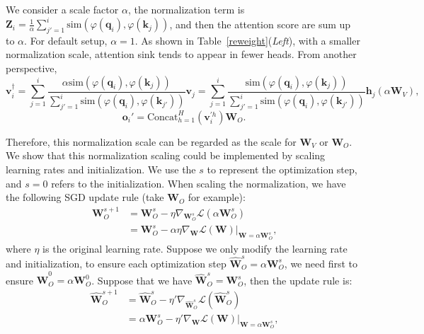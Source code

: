 \documentclass{article} \usepackage{iclr2025_conference,times}
\begin{document}
We consider a scale factor $\alpha$, the normalization term is $\boldsymbol{Z}_i=\frac{1}{\alpha}\sum_{j'=1}^i\textrm{sim}(\varphi(\boldsymbol{q}_i)\textrm{,}\,\varphi(\boldsymbol{k}_j))$, and then the attention score are sum up to $\alpha$. For default setup, $\alpha=\textrm{1}$. As shown in Table~\ref{reweight}(\emph{Left}), with a smaller normalization scale, attention sink tends to appear in fewer heads. From another perspective,
\begin{equation}
\boldsymbol{v}_i^{\dagger}=\sum_{j=1}^i\frac{\alpha
\textrm{sim}(\varphi(\boldsymbol{q}_i)\textrm{,}\,\varphi(\boldsymbol{k}_j))}{\sum_{j'=1}^i\textrm{sim}(\varphi(\boldsymbol{q}_i)\textrm{,}\,\varphi(\boldsymbol{k}_{j'}))}\boldsymbol{v}_j=\sum_{j=1}^i\frac{
\textrm{sim}(\varphi(\boldsymbol{q}_i)\textrm{,}\,\varphi(\boldsymbol{k}_j))}{\sum_{j'=1}^i\textrm{sim}(\varphi(\boldsymbol{q}_i)\textrm{,}\,\varphi(\boldsymbol{k}_{j'}))}\boldsymbol{h}_j(\alpha\boldsymbol{W}_V)\textrm{,}
\end{equation}
\begin{equation}
    \boldsymbol{o}_i'=\textrm{Concat}_{h=1}^H (\boldsymbol{v}_i^{'h})\boldsymbol{W}_O\textrm{.}
\end{equation}

Therefore, this normalization scale can be regarded as the scale for $\boldsymbol{W}_V$ or $\boldsymbol{W}_O$. We show that this normalization scaling could be implemented by scaling learning rates and initialization. We use the $s$ to represent the optimization step, and $s=\textrm{0}$ refers to the initialization. When scaling the normalization, we have the following SGD update rule (take $\boldsymbol{W}_O$ for example):
\begin{align}
    \boldsymbol{W}_O^{s+1}&=\boldsymbol{W}_O^{s}-\eta\nabla_{\boldsymbol{W}_O^{s}} \mathcal{L}(\alpha\boldsymbol{W}_O^{s})\\
    &=\boldsymbol{W}_O^{s}-\alpha\eta\nabla_{\boldsymbol{W}} \mathcal{L}(\boldsymbol{W})|_{\boldsymbol{W}=\alpha\boldsymbol{W}_O^{s}}\textrm{,}
\end{align}
where $\eta$ is the original learning rate. Suppose we only modify the learning rate and initialization, to ensure each optimization step $\hat{\boldsymbol{W}}_O^{s}=\alpha\boldsymbol{W}_O^{s}$, we need first to ensure $\hat{\boldsymbol{W}}_O^{0}=\alpha\boldsymbol{W}_O^{0}$. Suppose that we have $\hat{\boldsymbol{W}}_O^{s}=\boldsymbol{W}_O^{s}$, then the update rule is:
\begin{align}
\hat{\boldsymbol{W}}_O^{s+1}&=\hat{\boldsymbol{W}}_O^{s}-\eta'\nabla_{\hat{\boldsymbol{W}}_O^{s}} \mathcal{L}(\hat{\boldsymbol{W}}_O^{s})\\
&=\alpha\boldsymbol{W}_O^{s}-\eta'\nabla_{\boldsymbol{W}} \mathcal{L}(\boldsymbol{W})|_{\boldsymbol{W}=\alpha\boldsymbol{W}_O^{s}}\textrm{,}
\end{align}
\end{document}
